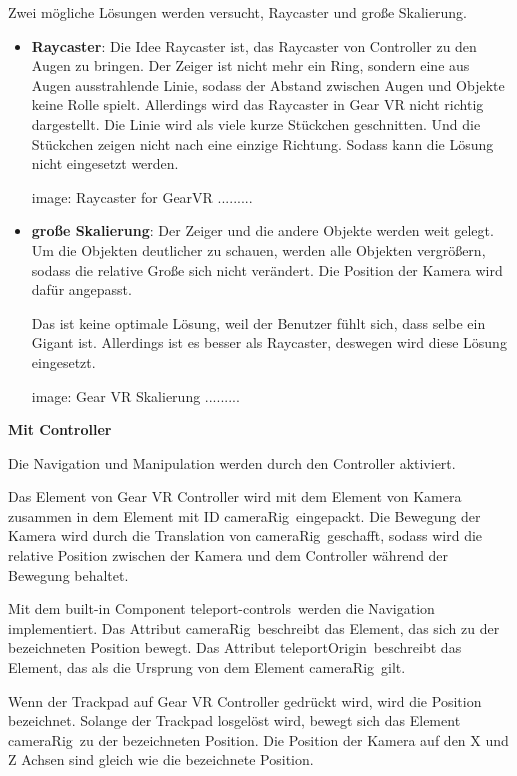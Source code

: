   Zwei mögliche Lösungen werden versucht, Raycaster und große Skalierung.
  \begin{itemize}
      \item \textbf{Raycaster}: Die Idee Raycaster ist, das Raycaster von Controller zu den Augen zu bringen. Der Zeiger ist nicht mehr ein Ring, sondern eine aus Augen ausstrahlende Linie, sodass der Abstand zwischen Augen und Objekte keine Rolle spielt. Allerdings wird das Raycaster in Gear VR nicht richtig dargestellt. Die Linie wird als viele kurze Stückchen geschnitten. Und die Stückchen zeigen nicht nach eine einzige Richtung. Sodass kann die Lösung nicht eingesetzt werden.
      
      image: Raycaster for GearVR .........
      
      \item \textbf{große Skalierung}: Der Zeiger und die andere Objekte werden weit gelegt. Um die Objekten deutlicher zu schauen, werden alle Objekten vergrößern, sodass die relative Große sich nicht verändert. Die Position der Kamera wird dafür angepasst.
      
      Das ist keine optimale Lösung, weil der Benutzer fühlt sich, dass selbe ein Gigant ist. Allerdings ist es besser als Raycaster, deswegen wird diese Lösung eingesetzt.
      
      image: Gear VR Skalierung .........
      
  \end{itemize}
  
  \textbf{Mit Controller}
  
  Die Navigation und Manipulation werden durch den Controller aktiviert.
  
  Das Element von Gear VR Controller wird mit dem Element von Kamera zusammen in dem Element mit ID \glqq cameraRig\grqq\ eingepackt. Die Bewegung der Kamera wird durch die Translation von \glqq cameraRig\grqq\ geschafft, sodass wird die relative Position zwischen der Kamera und dem Controller während der Bewegung behaltet.
  
  Mit dem built-in Component \glqq teleport-controls\grqq\ werden die Navigation implementiert. Das Attribut \glqq cameraRig\grqq\ beschreibt das Element, das sich zu der bezeichneten Position bewegt. Das Attribut \glqq teleportOrigin\grqq\ beschreibt das Element, das als die Ursprung von dem Element \glqq cameraRig\grqq\ gilt.
  
  Wenn der Trackpad auf Gear VR Controller gedrückt wird, wird die Position bezeichnet. Solange der Trackpad losgelöst wird, bewegt sich das Element \glqq cameraRig\grqq\ zu der bezeichneten Position. Die Position der Kamera auf den X und Z Achsen sind gleich wie die bezeichnete Position. 
  
